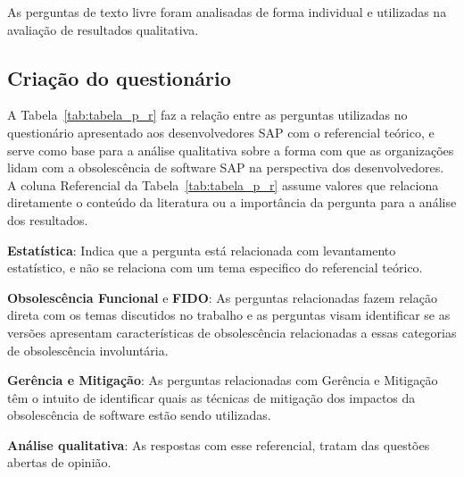As perguntas de texto livre foram analisadas de forma individual e utilizadas na avaliação de resultados qualitativa.

\subsection{\esp Criação do questionário }

A Tabela~\ref{tab:tabela_p_r} faz a relação entre as perguntas utilizadas no questionário apresentado aos desenvolvedores SAP com o referencial teórico, e serve como base para a análise qualitativa sobre a forma com que as organizações lidam com a obsolescência de software SAP na perspectiva dos desenvolvedores. A coluna Referencial da Tabela~\ref{tab:tabela_p_r} assume valores que relaciona diretamente o conteúdo da literatura ou a importância da pergunta para a análise dos resultados.

\textbf{Estatística}: Indica que a pergunta está relacionada com levantamento estatístico, e não se relaciona com um tema especifico do referencial teórico.

\textbf{Obsolescência Funcional} e \textbf{FIDO}: As perguntas relacionadas fazem relação direta com os temas discutidos no trabalho   e as perguntas visam identificar se as versões apresentam características de obsolescência relacionadas a essas categorias de obsolescência involuntária.

\textbf{Gerência e Mitigação}: As perguntas relacionadas com Gerência e Mitigação têm o intuito de identificar quais as técnicas de mitigação dos impactos da obsolescência de software estão sendo utilizadas.

\textbf{Análise qualitativa}: As respostas com esse referencial, tratam das questões abertas de opinião.

